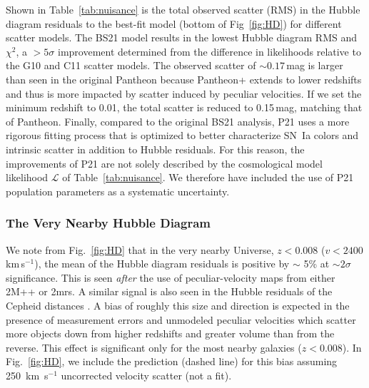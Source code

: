 \documentclass[twocolumn]{aastex63}
\begin{document}
Shown in Table~\ref{tab:nuisance} is the total observed scatter (RMS) in the Hubble diagram residuals to the best-fit model (bottom of Fig~\ref{fig:HD}) for different scatter models.
The BS21 model results in the lowest Hubble diagram RMS and $\chi^2$, a $>5\sigma$ improvement {determined from the difference in likelihoods relative to the} G10 and C11 scatter models.
The observed scatter of $\sim0.17$\,mag is larger than seen in the original Pantheon because Pantheon+ extends to lower redshifts and thus is more impacted by scatter induced by peculiar velocities. If we set the minimum redshift to 0.01, the total scatter is reduced to 0.15\,mag, matching that of Pantheon. {Finally, compared to the original BS21 analysis,
P21 uses a more rigorous fitting process that is optimized to better characterize SN~Ia colors and intrinsic scatter in addition to Hubble residuals. For this reason, the improvements of P21 are not solely described by the cosmological model likelihood $\mathcal{L}$ of Table~\ref{tab:nuisance}. We therefore have included the use of P21 population parameters as a systematic uncertainty. }


\subsubsection{The Very Nearby Hubble Diagram}
\label{sec:verynearby}
We note from Fig.~\ref{fig:HD} that in the very nearby Universe, $z<0.008$ ($v < 2400$\,km\,s$^{-1}$), the mean of the Hubble diagram residuals
is positive by $\sim$ 5\% at $\sim 2 \sigma$ significance.  This is seen {\it after} the use of peculiar-velocity maps from either 2M++ or 2mrs. A similar signal is also seen in the Hubble residuals of the Cepheid distances \citep{kenworthy22}. A bias of roughly this size and direction is expected in the presence of measurement errors and unmodeled peculiar velocities which scatter more objects down from higher redshifts and greater volume than from the reverse.  This effect is significant only for the most nearby galaxies ($z<0.008$). In Fig.~\ref{fig:HD}, we include the prediction (dashed line) for this bias assuming 250~km~s$^{-1}$ uncorrected velocity scatter (not a fit).
\end{document}
